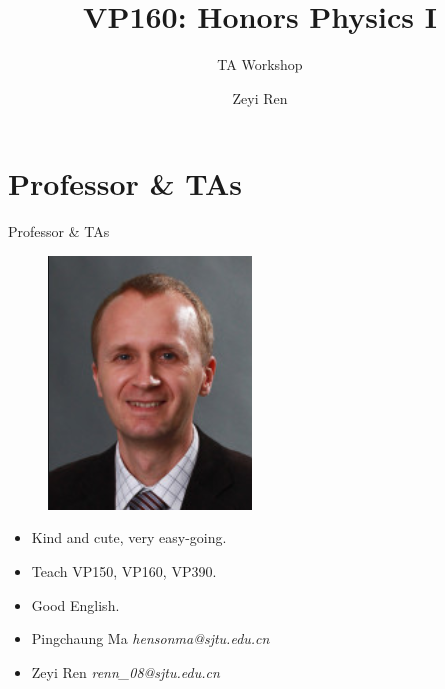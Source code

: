 \documentclass{beamer}
\title{VP160: Honors Physics I}
\subtitle{TA Workshop}
\author{Zeyi Ren}
\institute{UM-SJTU Joint Institute}
\begin{document}
\maketitle

\frame{\tableofcontents}

\section{Professor \& TAs}
\begin{frame}{Professor \& TAs}
    \begin{figure}[T]
        \centering
        \includegraphics[width=0.2 \linewidth, angle =0]{mk.png}
      \end{figure}
      \begin{itemize}
        \item Kind and cute, very easy-going.
        \item Teach VP150, VP160, VP390.
        \item Good English.
      \end{itemize}
      \begin{itemize}
        \item Pingchaung Ma \quad \textit{hensonma@sjtu.edu.cn} 
        \item Zeyi Ren \quad\quad\quad\quad \textit{renn\_08@sjtu.edu.cn}
      \end{itemize}
\end{frame}
\end{document}
